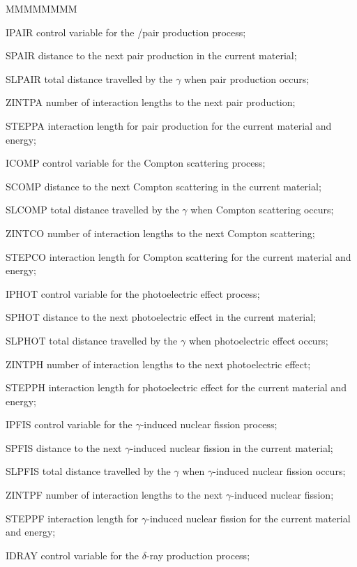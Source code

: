 \begin{DLtt}{MMMMMMMM}
\item[IPAIR] control variable for the \Pem/\Pep pair production process;
\item[SPAIR] distance to the next pair production in the current material;
\item[SLPAIR] total distance travelled by the $\gamma$ when pair production occurs;
\item[ZINTPA] number of interaction lengths to the next pair production;
\item[STEPPA] interaction length for pair production for the current material
and energy;
\item[ICOMP] control variable for the Compton scattering process;
\item[SCOMP] distance to the next Compton scattering in the current material;
\item[SLCOMP] total distance travelled by the $\gamma$ when Compton scattering occurs;
\item[ZINTCO] number of interaction lengths to the next Compton scattering;
\item[STEPCO] interaction length for Compton scattering for the current material
and energy;
\item[IPHOT] control variable for the photoelectric effect process;
\item[SPHOT] distance to the next photoelectric effect in the current material;
\item[SLPHOT] total distance travelled by the $\gamma$ when photoelectric effect occurs;
\item[ZINTPH] number of interaction lengths to the next photoelectric effect;
\item[STEPPH] interaction length for photoelectric effect for the current material
and energy;
\item[IPFIS] control variable for the $\gamma$-induced nuclear fission process;
\item[SPFIS] distance to the next $\gamma$-induced nuclear fission in the current 
material;
\item[SLPFIS] total distance travelled by the $\gamma$ when $\gamma$-induced nuclear 
fission occurs;
\item[ZINTPF] number of interaction lengths to the next $\gamma$-induced nuclear 
fission;
\item[STEPPF] interaction length for $\gamma$-induced nuclear fission for the 
current material and energy;
\item[IDRAY] control variable for the $\delta$-ray production process;

\end{DLtt}
